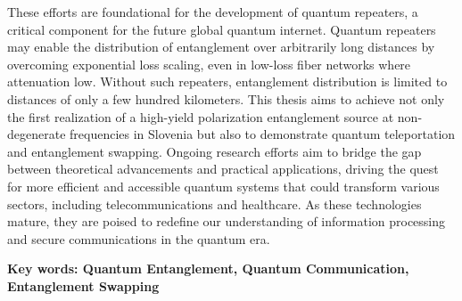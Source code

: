 \documentclass{article}
\theoremstyle{mytheoremstyle}
\theoremstyle{mytheoremstyle}
\theoremstyle{myproblemstyle}
\begin{document}
These efforts are foundational for the development of quantum repeaters, a critical component for the future global quantum internet.
Quantum repeaters may enable the distribution of entanglement over arbitrarily long distances by overcoming exponential loss scaling,
even in low-loss fiber networks where attenuation low. Without such repeaters, entanglement distribution is limited to distances 
of only a few hundred kilometers. This thesis aims to achieve not only the first realization of a high-yield polarization entanglement
source at non-degenerate frequencies in Slovenia but also to demonstrate quantum teleportation and entanglement swapping.
Ongoing research efforts aim to bridge the gap between theoretical advancements and practical applications,
driving the quest for more efficient and accessible quantum systems that could transform various sectors,
including telecommunications and healthcare. As these technologies mature, they are poised to redefine our
understanding of information processing and secure communications in the quantum era.
\par\textbf{Key words: Quantum Entanglement, Quantum Communication, Entanglement Swapping}
\end{document}
